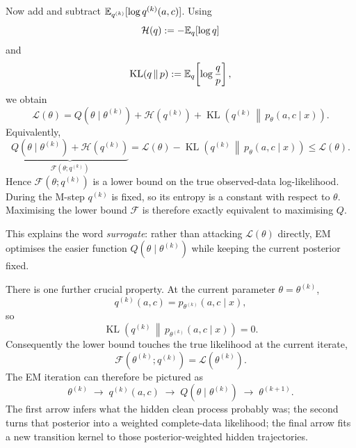 Now add and subtract
$\mathbb{E}_{q^{(k)}}[\log q^{(k)}(a,c)]$. Using
\begin{equation}
  \mathcal H(q)
  :=
  -\mathbb{E}_q[\log q]
\end{equation}
and
\begin{equation}
  \operatorname{KL}(q\,\|\,p)
  :=
  \mathbb{E}_q\!\left[
    \log\frac{q}{p}
  \right],
\end{equation}
we obtain
\begin{equation}
  \boxed{
  \mathcal L(\theta)
  =
  Q(\theta\mid\theta^{(k)})
  +
  \mathcal H(q^{(k)})
  +
  \operatorname{KL}\!\left(
    q^{(k)}
    \,\middle\|\,
    p_\theta(a,c\mid x)
  \right).
  }
  \label{eq:em-decomposition}
\end{equation}
Equivalently,
\begin{equation}
  \underbrace{
    Q(\theta\mid\theta^{(k)})
    +
    \mathcal H(q^{(k)})
  }_{\displaystyle \mathcal F(\theta;q^{(k)})}
  =
  \mathcal L(\theta)
  -
  \operatorname{KL}\!\left(
    q^{(k)}
    \,\middle\|\,
    p_\theta(a,c\mid x)
  \right)
  \leq
  \mathcal L(\theta).
  \label{eq:em-lower-bound}
\end{equation}
Hence
$\mathcal F(\theta;q^{(k)})$ is a lower bound on the true observed-data
log-likelihood. During the M-step $q^{(k)}$ is fixed, so its entropy is a
constant with respect to $\theta$. Maximising the lower bound
$\mathcal F$ is therefore exactly equivalent to maximising $Q$.

This explains the word \emph{surrogate}: rather than attacking
$\mathcal L(\theta)$ directly, EM optimises the easier function
$Q(\theta\mid\theta^{(k)})$ while keeping the current posterior fixed.

There is one further crucial property. At the current parameter
$\theta=\theta^{(k)}$,
\begin{equation}
  q^{(k)}(a,c)
  =
  p_{\theta^{(k)}}(a,c\mid x),
\end{equation}
so
\begin{equation}
  \operatorname{KL}\!\left(
    q^{(k)}
    \,\middle\|\,
    p_{\theta^{(k)}}(a,c\mid x)
  \right)
  =0.
\end{equation}
Consequently the lower bound touches the true likelihood at the current
iterate,
\begin{equation}
  \mathcal F(\theta^{(k)};q^{(k)})
  =
  \mathcal L(\theta^{(k)}).
  \label{eq:em-touching}
\end{equation}
The EM iteration can therefore be pictured as
\[
  \theta^{(k)}
  \;\longrightarrow\;
  q^{(k)}(a,c)
  \;\longrightarrow\;
  Q(\theta\mid\theta^{(k)})
  \;\longrightarrow\;
  \theta^{(k+1)}.
\]
The first arrow infers what the hidden clean process probably was; the second
turns that posterior into a weighted complete-data likelihood; the final arrow
fits a new transition kernel to those posterior-weighted hidden trajectories.

